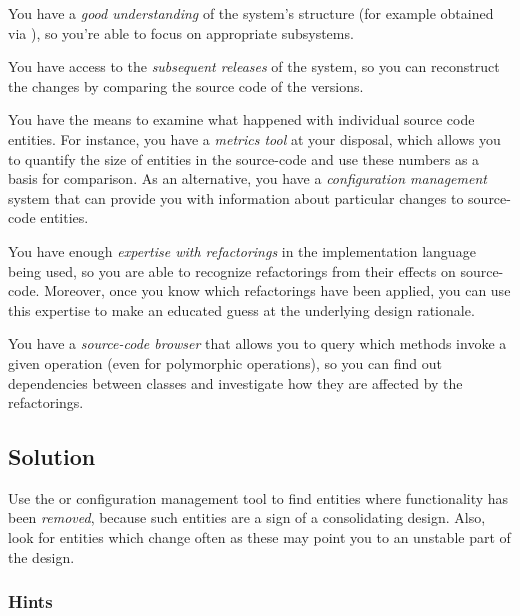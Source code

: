 \documentclass[a4paper,10pt,twoside]{book}
\begin{document}
\begin{bulletlist}
\item You have a \emph{good understanding} of the system's structure (for example obtained via ), so you're able to focus on appropriate subsystems.

\item You have access to the \emph{subsequent releases} of the system, so you can reconstruct the changes by comparing the source code of the versions.

\item You have the means to examine what happened with individual source code entities. For instance, you have a \emph{metrics tool} at your disposal, which allows you to quantify the size of entities in the source-code and use these numbers as a basis for comparison. As an alternative, you have a \emph{configuration management} system that can provide you with information about particular changes to source-code entities.

\item You have enough \emph{expertise with refactorings} in the implementation language being used, so you are able to recognize refactorings from their effects on source-code. Moreover, once you know which refactorings have been applied, you can use this expertise to make an educated guess at the underlying design rationale.

\item You have a \emph{source-code browser} that allows you to query which methods invoke a given operation (even for polymorphic operations), so you can find out dependencies between classes and investigate how they are affected by the refactorings.
\end{bulletlist}

\subsection*{Solution}

Use the  or configuration management tool to find entities where functionality has been \emph{removed}, because such entities are a sign of a consolidating design. Also, look for entities which change often as these may point you to an unstable part of the design.

\subsubsection*{Hints}
\end{document}
